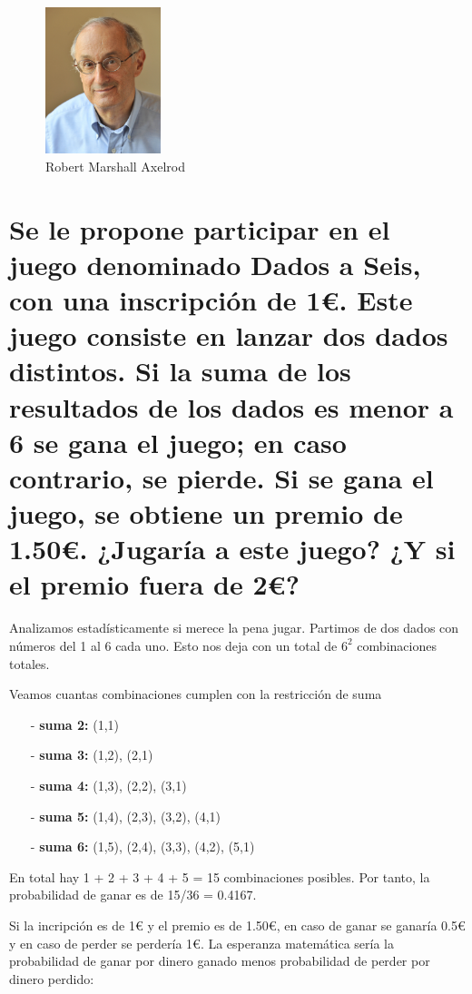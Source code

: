 \documentclass{llncs}
\begin{document}
\begin{figure}[H]
	\begin{center}
		\includegraphics[width=0.3\textwidth]{axelrod.jpg}
		\caption{Robert Marshall Axelrod}
	\end{center}
\end{figure}

\newpage
\section{Se le propone participar en el juego denominado Dados a Seis, con una inscripción de 1€. Este juego consiste en lanzar dos dados distintos. Si la suma de los resultados de los dados es menor a 6 se gana el juego; en caso contrario, se pierde. Si se gana el juego, se obtiene un premio de 1.50€. ¿Jugaría a este juego? ¿Y si el premio fuera de 2€?}

Analizamos estadísticamente si merece la pena jugar.
Partimos de dos dados con números del 1 al 6 cada uno. Esto nos deja con un total de $6^2$ combinaciones totales.

Veamos cuantas combinaciones cumplen con la restricción de suma 

\begin{enumerate}
	\item [-] \textbf{suma 2:} (1,1)
	\item [-] \textbf{suma 3:} (1,2), (2,1)
	\item [-] \textbf{suma 4:} (1,3), (2,2), (3,1)
	\item [-] \textbf{suma 5:} (1,4), (2,3), (3,2), (4,1)
	\item [-] \textbf{suma 6:} (1,5), (2,4), (3,3), (4,2), (5,1)
\end{enumerate}

En total hay 1 + 2 + 3 + 4 + 5 = 15 combinaciones posibles. Por tanto, la probabilidad de ganar es de 15/36 = 0.4167.

\vspace{0.25cm}
Si la incripción es de 1€ y el premio es de 1.50€, en caso de ganar se ganaría 0.5€ y en caso de perder se perdería 1€. La esperanza matemática sería la probabilidad de ganar por dinero ganado menos probabilidad de perder por dinero perdido:
\end{document}

